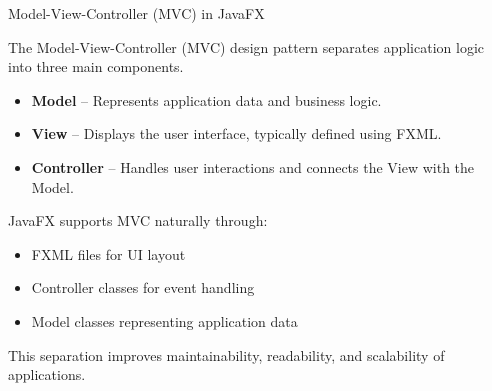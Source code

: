 \documentclass[aspectratio=169, table]{beamer}
\begin{document}
\begin{frame}[fragile]{Model-View-Controller (MVC) in JavaFX}
\vspace{20pt}

The Model-View-Controller (MVC) design pattern separates application logic into three main components.

\begin{itemize}
\item \textbf{Model} – Represents application data and business logic.
\item \textbf{View} – Displays the user interface, typically defined using FXML.
\item \textbf{Controller} – Handles user interactions and connects the View with the Model.
\end{itemize}

\bigskip

JavaFX supports MVC naturally through:

\begin{itemize}
\item FXML files for UI layout
\item Controller classes for event handling
\item Model classes representing application data
\end{itemize}

\bigskip

This separation improves maintainability, readability, and scalability of applications.

\end{frame}
\end{document}
